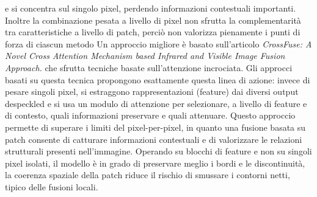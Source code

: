 e si concentra sul singolo pixel, perdendo informazioni contestuali importanti. 
Inoltre la combinazione pesata a livello di pixel non sfrutta la complementarità tra caratteristiche a livello di 
patch, perciò non valorizza pienamente i punti di forza di ciascun metodo
Un approccio migliore è basato sull'articolo 
\textit{CrossFuse: A Novel Cross Attention Mechanism based Infrared and Visible Image Fusion Approach.} \cite{li2024crossfuse} che sfrutta tecniche basate sull'attenzione 
incrociata. Gli approcci basati su questa tecnica propongono esattamente questa linea di azione: 
invece di pesare singoli pixel, si estraggono rappresentazioni (feature) dai diversi output despeckled e si usa un modulo 
di attenzione per selezionare, a livello di feature e di contesto, quali informazioni preservare e quali attenuare. 
Questo approccio permette di superare i limiti del pixel-per-pixel, in quanto una fusione basata su patch consente 
di catturare informazioni contestuali e di valorizzare le relazioni strutturali presenti nell’immagine. Operando 
su blocchi di feature e non su singoli pixel isolati, il modello è in grado di preservare meglio i bordi e le 
discontinuità, la coerenza spaziale della patch riduce il rischio di smussare i contorni netti, tipico delle 
fusioni locali.